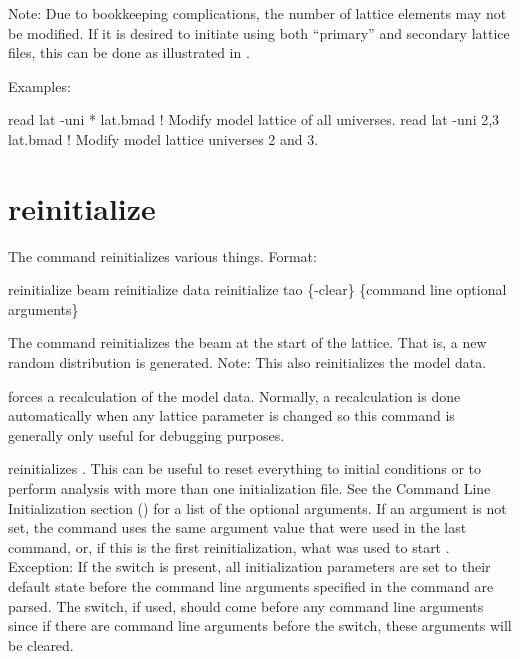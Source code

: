 Note: Due to bookkeeping complications, the number of lattice elements may not be modified. If it is
desired to initiate \tao using both ``primary'' and secondary lattice files, this can be done as
illustrated in .

Examples:
\begin{example}
  read lat -uni * lat.bmad   ! Modify model lattice of all universes.
  read lat -uni 2,3 lat.bmad ! Modify model lattice universes 2 and 3.
\end{example}

\section{reinitialize}
\label{s:reinit}

The  command reinitializes various things. Format:
\begin{example}
  reinitialize beam
  reinitialize data
  reinitialize tao \{-clear\} \{command line optional arguments\}
\end{example}

\vskip 10pt 

The  command reinitializes the beam at the start of the lattice. That is, a
new random distribution is generated.  Note: This also reinitializes the model data.

 forces a recalculation of the model data.  Normally, a recalculation is done
automatically when any lattice parameter is changed so this command is generally only useful for
debugging purposes.

 reinitializes \tao. This can be useful to reset everything to initial
conditions or to perform analysis with more than one initialization file. See the Command Line
Initialization section () for a list of the optional arguments. If an argument
is not set, the  command uses the same argument value that were used in the last
 command, or, if this is the first reinitialization, what was used to start \tao.
Exception: If the  switch is present, all initialization parameters are set to their
default state before the command line arguments specified in the  command are
parsed. The  switch, if used, should come before any command line arguments since if
there are command line arguments before the  switch, these arguments will be cleared.

